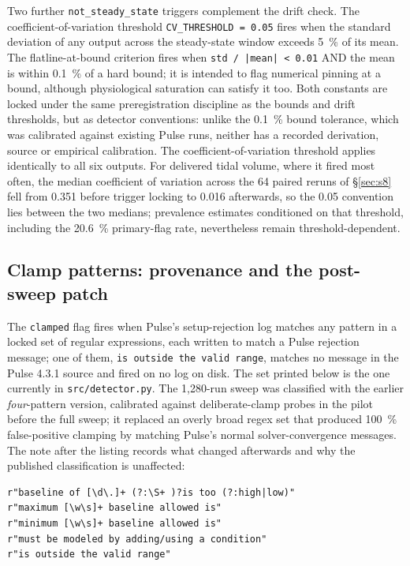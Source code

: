 \documentclass[pdflatex,sn-nature]{sn-jnl}%
\begin{document}
Two further \texttt{not\_steady\_state} triggers complement the drift check. The coefficient-of-variation threshold \texttt{CV\_THRESHOLD = 0.05} fires when the standard deviation of any output across the steady-state window exceeds 5~\% of its mean. The flatline-at-bound criterion fires when \texttt{std / |mean| < 0.01} AND the mean is within 0.1~\% of a hard bound; it is intended to flag numerical pinning at a bound, although physiological saturation can satisfy it too. Both constants are locked under the same preregistration discipline as the bounds and drift thresholds, but as detector conventions: unlike the 0.1~\% bound tolerance, which was calibrated against existing Pulse runs, neither has a recorded derivation, source or empirical calibration. The coefficient-of-variation threshold applies identically to all six outputs. For delivered tidal volume, where it fired most often, the median coefficient of variation across the 64 paired reruns of \S\ref{sec:s8} fell from 0.351 before trigger locking to 0.016 afterwards, so the 0.05 convention lies between the two medians; prevalence estimates conditioned on that threshold, including the 20.6~\% primary-flag rate, nevertheless remain threshold-dependent.

\subsection{Clamp patterns: provenance and the post-sweep patch}\label{sec:s3-clamp}

The \texttt{clamped} flag fires when Pulse's setup-rejection log matches any pattern in a locked set of regular expressions, each written to match a Pulse rejection message; one of them, \texttt{is outside the valid range}, matches no message in the Pulse 4.3.1 source and fired on no log on disk. The set printed below is the one currently in \texttt{src/detector.py}. The 1{,}280-run sweep was classified with the earlier \emph{four}-pattern version, calibrated against deliberate-clamp probes in the pilot before the full sweep; it replaced an overly broad regex set that produced 100~\% false-positive clamping by matching Pulse's normal solver-convergence messages. The note after the listing records what changed afterwards and why the published classification is unaffected:

\noindent\begin{minipage}{\linewidth}
\begin{lstlisting}[basicstyle=\ttfamily\small, breaklines=true]
r"baseline of [\d\.]+ (?:\S+ )?is too (?:high|low)"
r"maximum [\w\s]+ baseline allowed is"
r"minimum [\w\s]+ baseline allowed is"
r"must be modeled by adding/using a condition"
r"is outside the valid range"
\end{lstlisting}
\end{minipage}
\end{document}
